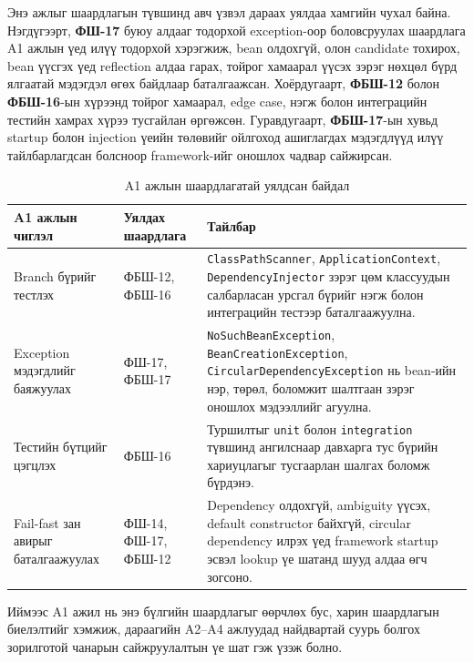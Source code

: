 Энэ ажлыг шаардлагын түвшинд авч үзвэл дараах уялдаа хамгийн чухал байна. Нэгдүгээрт, \textbf{ФШ-17} буюу алдааг тодорхой exception-оор боловсруулах шаардлага A1 ажлын үед илүү тодорхой хэрэгжиж, bean олдохгүй, олон candidate тохирох, bean үүсгэх үед reflection алдаа гарах, тойрог хамаарал үүсэх зэрэг нөхцөл бүрд ялгаатай мэдэгдэл өгөх байдлаар баталгаажсан. Хоёрдугаарт, \textbf{ФБШ-12} болон \textbf{ФБШ-16}-ын хүрээнд тойрог хамаарал, edge case, нэгж болон интеграцийн тестийн хамрах хүрээ тусгайлан өргөжсөн. Гуравдугаарт, \textbf{ФБШ-17}-ын хувьд startup болон injection үеийн төлөвийг ойлгоход ашиглагдах мэдэгдлүүд илүү тайлбарлагдсан болсноор framework-ийг оношлох чадвар сайжирсан.

\begin{table}[H]
\centering
\small
\setlength{\tabcolsep}{4pt}
\caption{A1 ажлын шаардлагатай уялдсан байдал}
\label{tab:a1-requirement-alignment}
\renewcommand{\arraystretch}{1.3}
\begin{tabularx}{\textwidth}{|L{0.24\textwidth}|L{0.18\textwidth}|Y|}
\hline
\textbf{A1 ажлын чиглэл} & \textbf{Уялдах шаардлага} & \textbf{Тайлбар} \\ \hline
Branch бүрийг тестлэх & ФБШ-12, ФБШ-16 & \texttt{ClassPathScanner}, \texttt{ApplicationContext}, \texttt{DependencyInjector} зэрэг цөм классуудын салбарласан урсгал бүрийг нэгж болон интеграцийн тестээр баталгаажуулна. \\ \hline
Exception мэдэгдлийг баяжуулах & ФШ-17, ФБШ-17 & \texttt{NoSuchBeanException}, \texttt{BeanCreationException}, \texttt{CircularDependencyException} нь bean-ийн нэр, төрөл, боломжит шалтгаан зэрэг оношлох мэдээллийг агуулна. \\ \hline
Тестийн бүтцийг цэгцлэх & ФБШ-16 & Туршилтыг \texttt{unit} болон \texttt{integration} түвшинд ангилснаар давхарга тус бүрийн хариуцлагыг тусгаарлан шалгах боломж бүрдэнэ. \\ \hline
Fail-fast зан авирыг баталгаажуулах & ФШ-14, ФШ-17, ФБШ-12 & Dependency олдохгүй, ambiguity үүсэх, default constructor байхгүй, circular dependency илрэх үед framework startup эсвэл lookup үе шатанд шууд алдаа өгч зогсоно. \\ \hline
\end{tabularx}
\end{table}

Иймээс A1 ажил нь энэ бүлгийн шаардлагыг өөрчлөх бус, харин шаардлагын биелэлтийг хэмжиж, дараагийн A2--A4 ажлуудад найдвартай суурь болгох зорилготой чанарын сайжруулалтын үе шат гэж үзэж болно.


